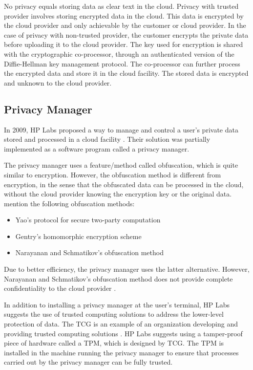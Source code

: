 \documentclass[pdftex,english,10pt,b5paper,twoside]{book}
\begin{document}
No privacy equals storing data as clear text in the cloud. Privacy with trusted
provider involves storing encrypted data in the cloud. This data is encrypted by
the cloud provider and only achievable by the customer or cloud provider.
In the case of privacy with non-trusted provider, the customer encrypts the
private data before uploading it to the cloud provider. The key used for
encryption is shared with the cryptographic co-processor, through an
authenticated version of the Diffie-Hellman key management protocol. The
co-processor can further process the encrypted data and store it in the cloud
facility. The stored data is encrypted and unknown to the cloud provider.

\subsection{Privacy Manager}
In 2009, HP Labs proposed a way to manage and control a user's private data stored and
processed in a cloud facility \cite{privacymanager}. Their solution was partially implemented
as a software program called a privacy manager.

The privacy manager uses a feature/method called obfuscation, which is quite similar to
encryption. However, the obfuscation method is different from encryption, in the
sense that the obfuscated data can be processed in the cloud, without the cloud
provider knowing the encryption key or the original data. \cite{privacymanager} mention the following
obfuscation methods:
\begin{itemize}
\item Yao's protocol for secure two-party computation \cite{yao}
\item Gentry's homomorphic encryption scheme \cite{gentry}
\item Narayanan and Schmatikov's obfuscation method \cite{obfuscationmethod}
\end{itemize}
Due to better efficiency, the privacy manager uses the latter alternative. However,
Narayanan and Schmatikov's obfuscation method does not provide complete
confidentiality to the cloud provider \cite{obfuscationmethod}.

In addition to installing a privacy manager at the user's terminal, HP Labs suggests
the use of trusted computing solutions to address the lower-level protection of
data. The \ac{TCG} is an example of an organization
developing and providing trusted computing solutions \cite{tcg}. HP Labs
suggests using a tamper-proof piece of hardware called a \ac{TPM}, which is
designed by TCG. The TPM is installed in the machine running the
privacy manager to ensure that processes carried out by the privacy manager can be
fully trusted.
\end{document}
